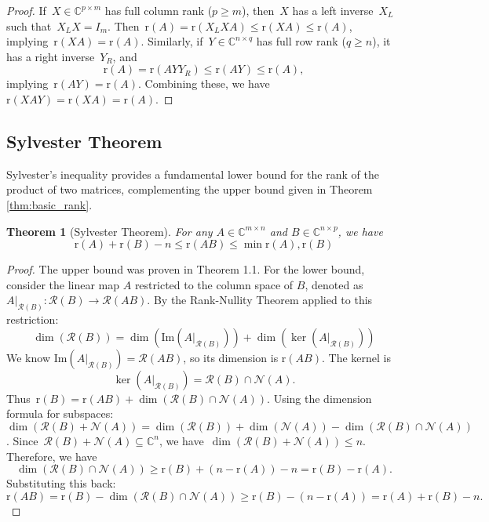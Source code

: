 \documentclass[12pt]{article}
\newtheorem{theorem}{Theorem}[section]
\newcommand{\rank}{\mathrm{r}}
\newcommand{\C}{\mathbb{C}}
\begin{document}
\begin{proof}
If~$X \in \C^{p \times m}$ has full column rank ($p \ge m$), then~$X$ has a left inverse~$X_L$ such that~$X_L X = I_m$. Then~$\rank(A) = \rank(X_L X A) \le \rank(XA) \le \rank(A)$, implying~$\rank(XA) = \rank(A)$.
Similarly, if~$Y \in \C^{n \times q}$ has full row rank ($q \ge n$), it has a right inverse~$Y_R$, and 
$$\rank(A) = \rank(A Y Y_R) \le \rank(AY) \le \rank(A),$$ implying~$\rank(AY) = \rank(A). $
Combining these, we have~$\rank(XAY) = \rank(XA) = \rank(A)$.
\end{proof}

\subsection{Sylvester Theorem}

Sylvester's inequality provides a fundamental lower bound for the rank of the product of two matrices, complementing the upper bound given in Theorem \ref{thm:basic_rank}.

\begin{theorem}[Sylvester Theorem]
For any $A \in \C^{m \times n}$ and $B \in \C^{n \times p}$, we have
\[
\rank(A) + \rank(B) - n \le \rank(AB) \le \min \rank(A), \rank(B)
\]
\end{theorem}

\begin{proof}
The upper bound was proven in Theorem 1.1. For the lower bound, consider the linear map $A$ restricted to the column space of $B$, denoted as $A|_{\mathcal{R}(B)}: \mathcal{R}(B) \to \mathcal{R}(AB)$.
By the Rank-Nullity Theorem applied to this restriction:
\[
\dim(\mathcal{R}(B)) = \dim(\text{Im}(A|_{\mathcal{R}(B)})) + \dim(\ker(A|_{\mathcal{R}(B)}))
\]
We know $\text{Im}(A|_{\mathcal{R}(B)}) = \mathcal{R}(AB)$, so its dimension is $\rank(AB)$.
The kernel is 
$$\ker(A|_{\mathcal{R}(B)}) = \mathcal{R}(B) \cap \mathcal{N}(A).$$
Thus~$\rank(B) = \rank(AB) + \dim(\mathcal{R}(B) \cap \mathcal{N}(A))$.
Using the dimension formula for subspaces: 
$$\dim(\mathcal{R}(B) + \mathcal{N}(A)) = \dim(\mathcal{R}(B)) + \dim(\mathcal{N}(A)) - \dim(\mathcal{R}(B) \cap \mathcal{N}(A))$$.
Since~$\mathcal{R}(B) + \mathcal{N}(A) \subseteq \C^n$, we have~$\dim(\mathcal{R}(B) + \mathcal{N}(A)) \le n$.
Therefore, we have
$$\dim(\mathcal{R}(B) \cap \mathcal{N}(A)) \ge \rank(B) + (n - \rank(A)) - n = \rank(B) - \rank(A).$$
Substituting this back:
\[
\rank(AB) = \rank(B) - \dim(\mathcal{R}(B) \cap \mathcal{N}(A)) \ge \rank(B) - (n - \rank(A)) = \rank(A) + \rank(B) - n.
\]
\end{proof}
\end{document}

